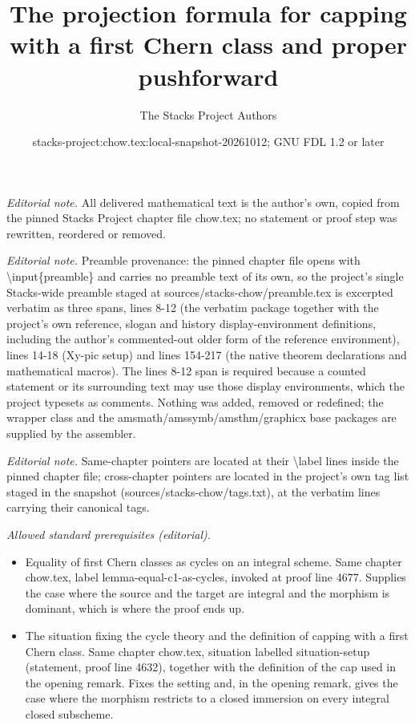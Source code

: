 \documentclass[10pt,a4paper]{amsart}
\title{The projection formula for capping with a first Chern class and proper pushforward}
\author{The Stacks Project Authors}
\date{stacks-project:chow.tex:local-snapshot-20261012; GNU FDL 1.2 or later}
\theoremstyle{plain}
\theoremstyle{definition}
\theoremstyle{remark}
\numberwithin{equation}{subsection}
\begin{document}
\maketitle
\noindent\textit{Editorial note.} All delivered mathematical text is the author's own, copied from the pinned Stacks Project chapter file chow.tex; no statement or proof step was rewritten, reordered or removed.\par\medskip
\noindent\textit{Editorial note.} Preamble provenance: the pinned chapter file opens with \textbackslash{}input\{preamble\} and carries no preamble text of its own, so the project's single Stacks-wide preamble staged at sources/stacks-chow/preamble.tex is excerpted verbatim as three spans, lines 8-12 (the verbatim package together with the project's own reference, slogan and history display-environment definitions, including the author's commented-out older form of the reference environment), lines 14-18 (Xy-pic setup) and lines 154-217 (the native theorem declarations and mathematical macros). The lines 8-12 span is required because a counted statement or its surrounding text may use those display environments, which the project typesets as comments. Nothing was added, removed or redefined; the wrapper class and the amsmath/amssymb/amsthm/graphicx base packages are supplied by the assembler.\par\medskip
\noindent\textit{Editorial note.} Same-chapter pointers are located at their \textbackslash{}label lines inside the pinned chapter file; cross-chapter pointers are located in the project's own tag list staged in the snapshot (sources/stacks-chow/tags.txt), at the verbatim lines carrying their canonical tags.\par\medskip
\noindent\textit{Allowed standard prerequisites (editorial).}\begin{itemize}
\item Equality of first Chern classes as cycles on an integral scheme. Same chapter chow.tex, label lemma-equal-c1-as-cycles, invoked at proof line 4677. Supplies the case where the source and the target are integral and the morphism is dominant, which is where the proof ends up.
\item The situation fixing the cycle theory and the definition of capping with a first Chern class. Same chapter chow.tex, situation labelled situation-setup (statement, proof line 4632), together with the definition of the cap used in the opening remark. Fixes the setting and, in the opening remark, gives the case where the morphism restricts to a closed immersion on every integral closed subscheme.
\end{itemize}\medskip
\end{document}

